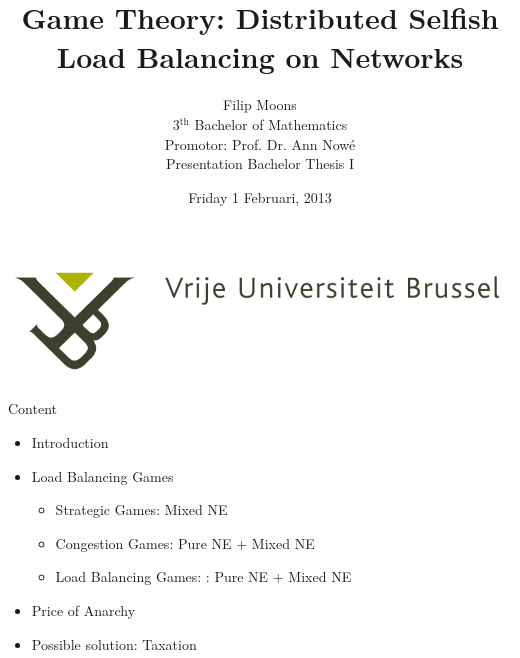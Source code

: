\documentclass{beamer}
\title{Game Theory: Distributed Selfish Load Balancing on Networks}
\author{Filip Moons\\3$^{\text{th}}$ Bachelor of Mathematics\\Promotor: Prof. Dr. Ann Now\'{e}\\Presentation Bachelor Thesis I}
\date{Friday 1 Februari, 2013}
\begin{document}
\begin{frame}[plain]
\includegraphics[width=0.4\paperwidth]{VUB_logo.jpg}
\vspace{2cm}
\titlepage
\end{frame}



%
%
%
%

\begin{frame}{Content}
\begin{itemize}
  \item Introduction
  \item Load Balancing Games
    \begin{itemize}
    \item Strategic Games: Mixed NE
    \item Congestion Games: Pure NE + Mixed NE
    \item Load Balancing Games: : Pure NE + Mixed NE
    \end{itemize}
  \item Price of Anarchy
  \item Possible solution: Taxation
\end{itemize}

\end{frame}
\end{document}
